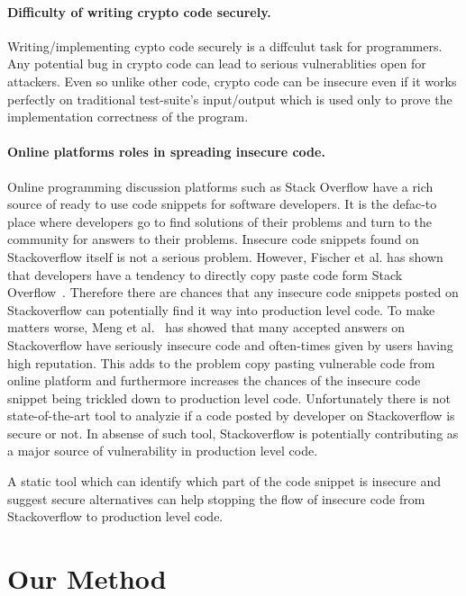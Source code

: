 \documentclass[sigconf]{acmart}
\begin{document}
\paragraph{Difficulty of writing crypto code securely.} Writing/implementing cypto code securely is a diffculut task for programmers. Any potential bug in crypto code can lead to serious vulnerablities open for attackers.
Even so unlike other code, crypto code can be insecure even if it works 
perfectly on traditional test-suite's input/output which is used only to prove the implementation correctness of the program.

\paragraph{Online platforms roles in spreading insecure code.} Online programming discussion platforms such as Stack Overflow have a rich source of ready to use code snippets for software developers. It is the defac-to place where developers go to find solutions of their problems and turn to the community for answers to their problems. 
Insecure code snippets found on Stackoverflow itself is not a serious problem. However,  
Fischer et al. has shown that developers have a tendency to directly copy paste code form Stack Overflow~\cite{fischer2017stack}. Therefore there are chances that any insecure code snippets posted on Stackoverflow can potentially find it way into production level code. To make matters worse, Meng et al.~\cite{meng2018secure} has showed that many accepted answers on Stackoverflow have seriously insecure code and often-times given by users having high reputation. This adds to the problem copy pasting vulnerable code from online platform and furthermore increases the chances of the insecure code snippet being trickled down to production level code. 
Unfortunately there is not state-of-the-art tool to analyzie if a code posted by developer on Stackoverflow is secure or not. In absense of such tool, Stackoverflow is potentially contributing as a major source of vulnerability in production level code.  

A static tool which can identify which part of the code snippet is insecure and suggest secure alternatives can help stopping the flow of insecure code from Stackoverflow to production level code.


\section{Our Method}
\end{document}

